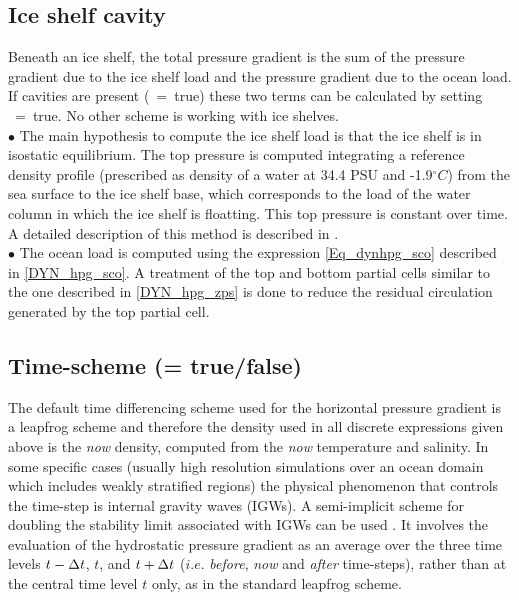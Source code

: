 \documentclass[NEMO_book]{subfiles}
\begin{document}
\subsection{Ice shelf cavity}
\label{DYN_hpg_isf}
Beneath an ice shelf, the total pressure gradient is the sum of the pressure gradient due to the ice shelf load and
 the pressure gradient due to the ocean load. If cavities are present (~=~true) these two terms can be
 calculated by setting ~=~true. No other scheme is working with ice shelves.\\

$\bullet$ The main hypothesis to compute the ice shelf load is that the ice shelf is in isostatic equilibrium.
 The top pressure is computed integrating a reference density profile (prescribed as density of a water at 34.4 
PSU and -1.9$^{\circ}C$) from the sea surface to the ice shelf base, which corresponds to the load of the water
column in which the ice shelf is floatting. This top pressure is constant over time. A detailed description of 
this method is described in \citet{Losch2008}.\\

$\bullet$ The ocean load is computed using the expression \eqref{Eq_dynhpg_sco} described in \ref{DYN_hpg_sco}. 
A treatment of the top and bottom partial cells similar to the one described in \ref{DYN_hpg_zps} is done 
to reduce the residual circulation generated by the top partial cell. 

\subsection   [Time-scheme (\np{ln\_dynhpg\_imp}) ]
			{Time-scheme (= true/false)}
\label{DYN_hpg_imp}

The default time differencing scheme used for the horizontal pressure gradient is 
a leapfrog scheme and therefore the density used in all discrete expressions given 
above is the  \textit{now} density, computed from the \textit{now} temperature and 
salinity. In some specific cases (usually high resolution simulations over an ocean 
domain which includes weakly stratified regions) the physical phenomenon that 
controls the time-step is internal gravity waves (IGWs). A semi-implicit scheme for 
doubling the stability limit associated with IGWs can be used \citep{Brown_Campana_MWR78, 
Maltrud1998}. It involves the evaluation of the hydrostatic pressure gradient as an 
average over the three time levels $t-\Delta t$, $t$, and $t+\Delta t$ ($i.e.$  
\textit{before},  \textit{now} and  \textit{after} time-steps), rather than at the central 
time level $t$ only, as in the standard leapfrog scheme. 
\end{document}
